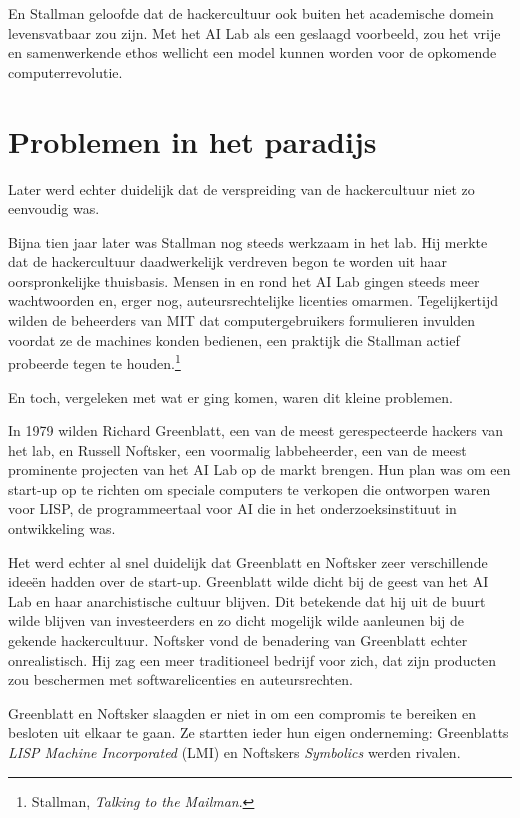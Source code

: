 \documentclass[
  a5paper,
  smalldemyvopaper,11pt,twoside,onecolumn,openright,extrafontsizes,
hidelinks]{memoir}
\begin{document}
En Stallman geloofde dat de hackercultuur ook buiten het academische
domein levensvatbaar zou zijn. Met het AI Lab als een geslaagd
voorbeeld, zou het vrije en samenwerkende ethos wellicht een model
kunnen worden voor de opkomende computerrevolutie.

\section{Problemen in het paradijs}\label{problemen-in-het-paradijs}

Later werd echter duidelijk dat de verspreiding van de hackercultuur
niet zo eenvoudig was.

Bijna tien jaar later was Stallman nog steeds werkzaam in het lab. Hij
merkte dat de hackercultuur daadwerkelijk verdreven begon te worden uit
haar oorspronkelijke thuisbasis. Mensen in en rond het AI Lab gingen
steeds meer wachtwoorden en, erger nog, auteursrechtelijke licenties
omarmen. Tegelijkertijd wilden de beheerders van MIT dat
computergebruikers formulieren invulden voordat ze de machines konden
bedienen, een praktijk die Stallman actief probeerde tegen te
houden.\footnote{\hspace{0pt}Stallman, \emph{Talking to the Mailman}.}

En toch, vergeleken met wat er ging komen, waren dit kleine problemen.

In 1979 wilden Richard Greenblatt, een van de meest gerespecteerde
hackers van het lab, en Russell Noftsker, een voormalig labbeheerder,
een van de meest prominente projecten van het AI Lab op de markt
brengen. Hun plan was om een start-up op te richten om speciale
computers te verkopen die ontworpen waren voor LISP, de programmeertaal
voor AI die in het onderzoeksinstituut in ontwikkeling was.

Het werd echter al snel duidelijk dat Greenblatt en Noftsker zeer
verschillende ideeën hadden over de start-up. Greenblatt wilde dicht bij
de geest van het AI Lab en haar anarchistische cultuur blijven. Dit
betekende dat hij uit de buurt wilde blijven van investeerders en zo
dicht mogelijk wilde aanleunen bij de gekende hackercultuur. Noftsker
vond de benadering van Greenblatt echter onrealistisch. Hij zag een meer
traditioneel bedrijf voor zich, dat zijn producten zou beschermen met
softwarelicenties en auteursrechten.

Greenblatt en Noftsker slaagden er niet in om een compromis te bereiken
en besloten uit elkaar te gaan. Ze startten ieder hun eigen onderneming:
Greenblatts \emph{LISP Machine Incorporated} (LMI) en Noftskers
\emph{Symbolics} werden rivalen.
\end{document}
